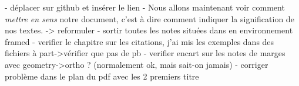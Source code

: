 - déplacer sur github et insérer le lien
- Nous allons maintenant voir comment \emph{mettre en sens} notre document, c'est à dire comment indiquer  la signification de nos textes. -> reformuler
- sortir toutes les notes situées dans en environnement framed
- verifier le chapitre sur les citations, j'ai mis les exemples dans des fichiers à part->vérifier que pas de pb
- verifier encart sur les notes de marges avec geometry->ortho ? (normalement ok, mais sait-on jamais)
- corriger problème dans le plan du pdf avec les 2 premiers titre